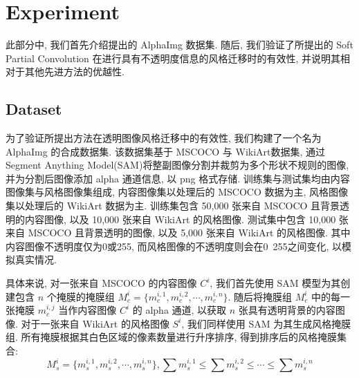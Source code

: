 \section{Experiment}

此部分中, 我们首先介绍提出的 AlphaImg 数据集. 随后, 我们验证了所提出的 Soft Partial Convolution 在进行具有不透明度信息的风格迁移时的有效性, 并说明其相对于其他先进方法的优越性.

\subsection{Dataset}

为了验证所提出方法在透明图像风格迁移中的有效性, 我们构建了一个名为 AlphaImg 的合成数据集. 该数据集基于 MSCOCO\cite{cocodatasetCOCOCommon} 与 WikiArt\cite{wikiartWikiArtorgVisual}数据集, 通过 Segment Anything Model(SAM)\cite{kirillov2023segment}将整副图像分割并裁剪为多个形状不规则的图像, 并为分割后图像添加 alpha 通道信息, 以 png 格式存储. 
训练集与测试集均由内容图像集与风格图像集组成, 内容图像集以处理后的 MSCOCO 数据为主, 风格图像集以处理后的 WikiArt 数据为主. 训练集包含 50,000 张来自 MSCOCO 且背景透明的内容图像, 以及 10,000 张来自 WikiArt 的风格图像. 测试集中包含 10,000 张来自 MSCOCO 且背景透明的图像, 以及 5,000 张来自 WikiArt 的风格图像. 其中内容图像不透明度仅为0或255, 而风格图像的不透明度则会在0~255之间变化, 以模拟真实情况.

具体来说, 对一张来自 MSCOCO 的内容图像 $C^i$, 我们首先使用 SAM 模型为其创建包含 $n$ 个掩膜的掩膜组 $M_c^i=\{m_c^{i,1}, m_c^{i,2}, \cdots, m_c^{i,n}\}$. 随后将掩膜组 $M_c^i$ 中的每一张掩膜 $m_c^{i,j}$ 当作内容图像 $C^i$ 的 alpha 通道, 以获取 $n$ 张具有透明背景的内容图像. 
对于一张来自 WikiArt 的风格图像 $S^i$, 我们同样使用 SAM 为其生成风格掩膜组. 所有掩膜根据其白色区域的像素数量进行升序排序, 得到排序后的风格掩膜集合:
\begin{equation}
    M_s^i=\{m_s^{i,1}, m_s^{i,2}, \cdots, m_s^{i,n}\}, \sum m_s^{i,1} \le \sum m_s^{i,2} \le \cdots \le \sum m_s^{i,n}
\end{equation}
 
